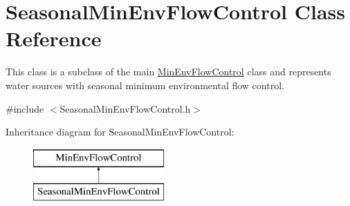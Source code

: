 \hypertarget{classSeasonalMinEnvFlowControl}{}\section{Seasonal\+Min\+Env\+Flow\+Control Class Reference}
\label{classSeasonalMinEnvFlowControl}


This class is a subclass of the main {\ttfamily \mbox{\hyperlink{classMinEnvFlowControl}{Min\+Env\+Flow\+Control}}} class and represents water sources with seasonal minimum environmental flow control.  




{\ttfamily \#include $<$Seasonal\+Min\+Env\+Flow\+Control.\+h$>$}

Inheritance diagram for Seasonal\+Min\+Env\+Flow\+Control\+:\begin{figure}[H]
\begin{center}
\leavevmode
\includegraphics[height=2.000000cm]{classSeasonalMinEnvFlowControl}
\end{center}
\end{figure}
